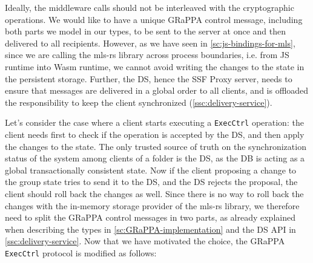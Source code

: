 Ideally, the middleware calls should not be interleaved with the cryptographic operations.
We would like to have a unique GRaPPA control message, including both parts we model in our types, 
to be sent to the server
at once and then delivered to all recipients.
However, as we have seen in \cref{sc:js-bindings-for-mls},
since we are calling the mls-rs library across process boundaries, i.e. from JS
runtime into Wasm runtime, we cannot avoid writing the changes to the state
in the persistent storage.
Further, the DS, hence the SSF Proxy server, needs to ensure that messages are delivered in
a global order to all clients, and is offloaded the responsibility to 
keep the client synchronized (\cref{ssc:delivery-service}).

Let's consider the case where a client starts executing a \texttt{ExecCtrl} operation:
the client needs first to check if the operation is accepted by the DS,
and then apply the changes to the state. The only trusted source of truth
on the synchronization status of the system among clients of a folder is
the DS, as the DB is acting as a global transactionally consistent state.
Now if the client proposing a change to the group state tries to send it
to the DS, and the DS rejects the proposal, the client should roll back the changes as well.
Since there is no way to roll back the changes with the in-memory storage provider
of the mls-rs library, we therefore need to split the GRaPPA control messages
in two parts, as already explained when describing the types in \cref{sc:GRaPPA-implementation}
and the DS API in \cref{ssc:delivery-service}.
Now that we have motivated the choice, the GRaPPA \texttt{ExecCtrl} protocol is modified as follows:
